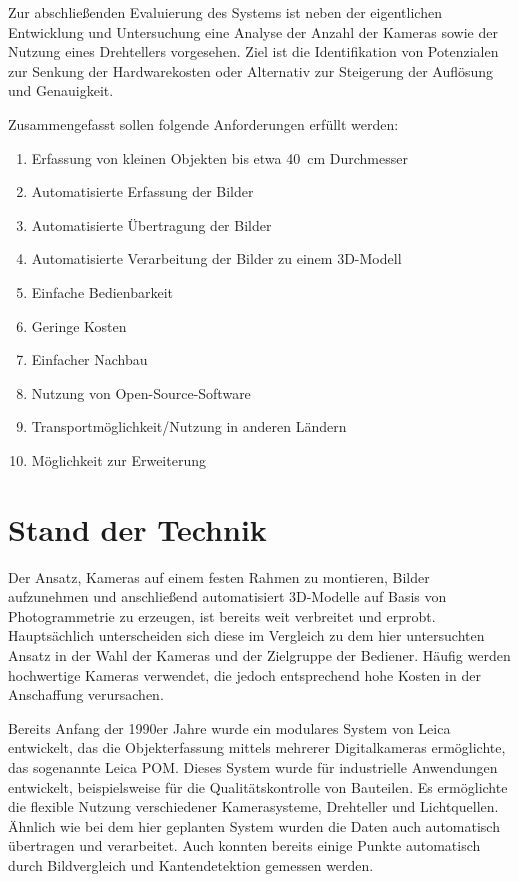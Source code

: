 \documentclass[./00PhotoBox]{subfiles}
\begin{document}
Zur abschließenden Evaluierung des Systems ist neben der eigentlichen Entwicklung und Untersuchung eine Analyse der Anzahl der Kameras sowie der Nutzung eines Drehtellers vorgesehen. Ziel ist die Identifikation von Potenzialen zur Senkung der Hardwarekosten oder Alternativ zur Steigerung der Auflösung und Genauigkeit.

Zusammengefasst sollen folgende Anforderungen erfüllt werden:

\begin{enumerate}
    \item Erfassung von kleinen Objekten bis etwa 40~cm Durchmesser
    \item Automatisierte Erfassung der Bilder
    \item Automatisierte Übertragung der Bilder
    \item Automatisierte Verarbeitung der Bilder zu einem 3D-Modell
    \item Einfache Bedienbarkeit
    \item Geringe Kosten
    \item Einfacher Nachbau
    \item Nutzung von Open-Source-Software
    \item Transportmöglichkeit/Nutzung in anderen Ländern
    \item Möglichkeit zur Erweiterung
\end{enumerate}

\section{Stand der Technik}
Der Ansatz, Kameras auf einem festen Rahmen zu montieren, Bilder aufzunehmen und anschließend automatisiert 3D-Modelle auf Basis von Photogrammetrie zu erzeugen, ist bereits weit verbreitet und erprobt. Hauptsächlich unterscheiden sich diese im Vergleich zu dem hier untersuchten Ansatz in der Wahl der Kameras und der Zielgruppe der Bediener. Häufig werden hochwertige Kameras verwendet, die jedoch entsprechend hohe Kosten in der Anschaffung verursachen.

Bereits Anfang der 1990er Jahre wurde ein modulares System von Leica entwickelt, das die Objekterfassung mittels mehrerer Digitalkameras ermöglichte, das sogenannte Leica POM. Dieses System wurde für industrielle Anwendungen entwickelt, beispielsweise für die Qualitätskontrolle von Bauteilen. Es ermöglichte die flexible Nutzung verschiedener Kamerasysteme, Drehteller und Lichtquellen. Ähnlich wie bei dem hier geplanten System wurden die Daten auch automatisch übertragen und verarbeitet. Auch konnten bereits einige Punkte automatisch durch Bildvergleich und Kantendetektion gemessen werden.
\citep{leica_pom_concept}
\end{document}
